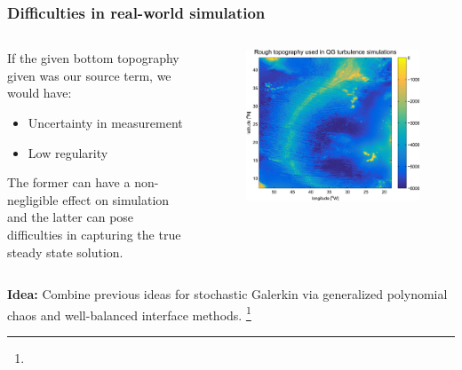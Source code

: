 \documentclass[
    pdf,
    11pt,
    xcolor={svgnames},
  ]{beamer}
\newcommand\blfootnote[1]{%
  \begingroup
  \renewcommand\thefootnote{}\footnote{\scriptsize #1}%
  \addtocounter{footnote}{-1}%
  \endgroup
}
\begin{document}
\begin{frame}
    \frametitle{Difficulties in real-world simulation}
    \begin{columns}
    \begin{column}{0.5\textwidth}
    If the given bottom topography given was our source term, we would have:
    \vspace{-1em}
    \begin{itemize}
        \item Uncertainty in measurement
        \item Low regularity
    \end{itemize}
    The former can have a non-negligible effect on simulation and the latter can pose difficulties in capturing the true steady state solution.
    \end{column}
    \begin{column}{0.5\textwidth}
        \begin{figure}
        \centering
        \includegraphics[width=\textwidth]{slides/bottom_topography.jpg}
        \end{figure}
    \end{column}
    \end{columns}
    {\bf Idea:} Combine previous ideas for stochastic Galerkin via generalized polynomial chaos and well-balanced interface methods.
    \blfootnote{}
\end{frame}

\end{document}
